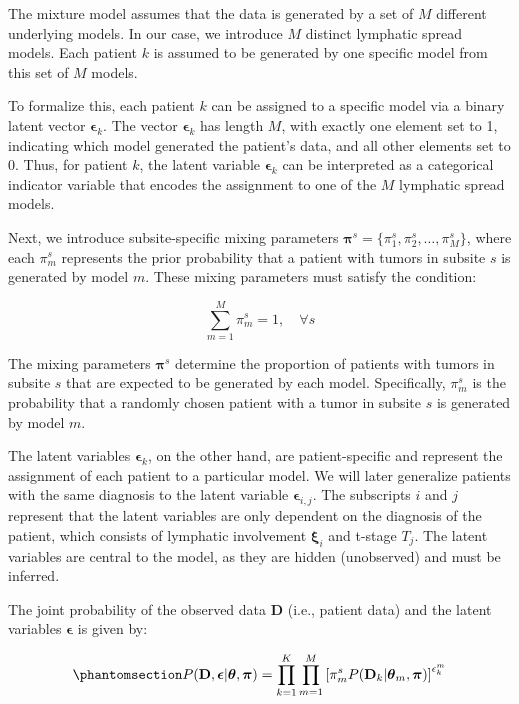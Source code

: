 \documentclass[
  sn-mathphys-num,
]{sn-jnl}
\begin{document}
The mixture model assumes that the data is generated by a set of \(M\)
different underlying models. In our case, we introduce \(M\) distinct
lymphatic spread models. Each patient \(k\) is assumed to be generated
by one specific model from this set of \(M\) models.

To formalize this, each patient \(k\) can be assigned to a specific
model via a binary latent vector \(\boldsymbol{\epsilon}_k\). The vector
\(\boldsymbol{\epsilon}_k\) has length \(M\), with exactly one element
set to 1, indicating which model generated the patient's data, and all
other elements set to 0. Thus, for patient \(k\), the latent variable
\(\boldsymbol{\epsilon}_k\) can be interpreted as a categorical
indicator variable that encodes the assignment to one of the \(M\)
lymphatic spread models.

Next, we introduce subsite-specific mixing parameters
\(\boldsymbol{\pi}^s = \{\pi_1^s, \pi_2^s, \dots, \pi_M^s\}\), where
each \(\pi_m^s\) represents the prior probability that a patient with
tumors in subsite \(s\) is generated by model \(m\). These mixing
parameters must satisfy the condition:

\[
\sum_{m=1}^M \pi_m^s = 1, \quad \forall s
\]

The mixing parameters \(\boldsymbol{\pi}^s\) determine the proportion of
patients with tumors in subsite \(s\) that are expected to be generated
by each model. Specifically, \(\pi_m^s\) is the probability that a
randomly chosen patient with a tumor in subsite \(s\) is generated by
model \(m\).

The latent variables \(\boldsymbol{\epsilon}_{k}\), on the other hand,
are patient-specific and represent the assignment of each patient to a
particular model. We will later generalize patients with the same
diagnosis to the latent variable \(\boldsymbol{\epsilon}_{i,j}\). The
subscripts \(i\) and \(j\) represent that the latent variables are only
dependent on the diagnosis of the patient, which consists of lymphatic
involvement \(\boldsymbol{\xi}_i\) and t-stage \(T_j\). The latent
variables are central to the model, as they are hidden (unobserved) and
must be inferred.

The joint probability of the observed data \(\mathbf{D}\) (i.e., patient
data) and the latent variables \(\boldsymbol{\epsilon}\) is given by:

\begin{equation}\phantomsection\label{eq-complete-likelihood}{
P(\mathbf{D}, \boldsymbol{\epsilon} | \boldsymbol{\theta}, \boldsymbol{\pi}) = \prod_{k=1}^{K} \prod_{m=1}^{M} \left[ \pi_m^s P(\mathbf{D}_k | \boldsymbol{\theta}_m, \boldsymbol{\pi}) \right]^{\epsilon_{k}^m}
}\end{equation}
\end{document}
